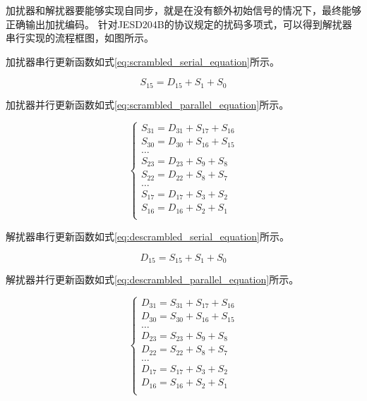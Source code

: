 \documentclass[UTF8]{ctexart}
\begin{document}
加扰器和解扰器要能够实现自同步，就是在没有额外初始信号的情况下，最终能够正确输出加扰编码。
针对JESD204B的协议规定的扰码多项式，可以得到解扰器串行实现的流程框图，如图所示。

加扰器串行更新函数如式\ref{eq:scrambled_serial_equation}所示。

\begin{equation}
\label{eq:scrambled_serial_equation}
S_{15} = D_{15} + S_1 + S_0
\end{equation}

加扰器并行更新函数如式\ref{eq:scrambled_parallel_equation}所示。

\begin{equation}
\label{eq:scrambled_parallel_equation}
\begin{cases}
	S_{31} = D_{31} + S_{17} + S_{16} \\
	S_{30} = D_{30} + S_{16} + S_{15} \\
	\dots							  \\
	S_{23} = D_{23} + S_{9} + S_{8}   \\
	S_{22} = D_{22} + S_{8} + S_{7}   \\
	\dots							  \\
	S_{17} = D_{17} + S_{3} + S_{2}   \\
	S_{16} = D_{16} + S_{2} + S_{1}   \\
\end{cases}
\end{equation}

解扰器串行更新函数如式\ref{eq:descrambled_serial_equation}所示。

\begin{equation}
\label{eq:descrambled_serial_equation}
D_{15} = S_{15} + S_1 + S_0
\end{equation}

解扰器并行更新函数如式\ref{eq:descrambled_parallel_equation}所示。

\begin{equation}
\label{eq:descrambled_parallel_equation}
\begin{cases}
	D_{31} = S_{31} + S_{17} + S_{16} \\
	D_{30} = S_{30} + S_{16} + S_{15} \\
	\dots							  \\
	D_{23} = S_{23} + S_{9} + S_{8}   \\
	D_{22} = S_{22} + S_{8} + S_{7}   \\
	\dots							  \\
	D_{17} = S_{17} + S_{3} + S_{2}   \\
	D_{16} = S_{16} + S_{2} + S_{1}   \\
\end{cases}
\end{equation}
\end{document}
